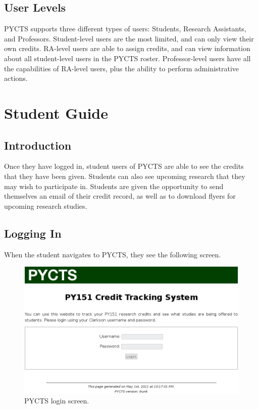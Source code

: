 \documentclass[letterpaper,titlepage]{article}
\begin{document}
\subsection{User Levels}
PYCTS supports three different types of users: Students, Research Assistants, and Professors. Student-level users are the most limited, and can only view their own credits. RA-level users are able to assign credits, and can view information about all student-level users in the PYCTS roster. Professor-level users have all the capabilities of RA-level users, plus the ability to perform administrative actions.

\newpage

\section{Student Guide}
\subsection{Introduction}
Once they have logged in, student users of PYCTS are able to see the credits that they have been given. Students can also see upcoming research that they may wish to participate in. Students are given the opportunity to send themselves an email of their credit record, as well as to download flyers for upcoming research studies.

\subsection{Logging In}
When the student navigates to PYCTS, they see the following screen.

\begin{figure}[H]
\includegraphics[width=\textwidth]{images/student_login.png}
\caption{PYCTS login screen.}
\label{student_login}
\end{figure}
\end{document}
